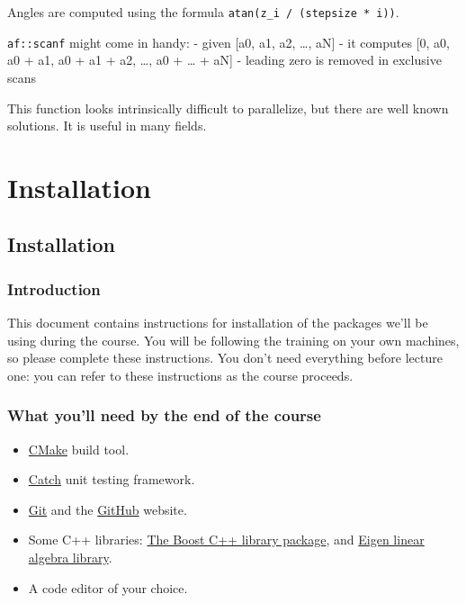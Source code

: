 Angles are computed using the formula
\texttt{atan(z\_i / (stepsize * i))}.

\texttt{af::scanf} might come in handy: - given {[}a0, a1, a2, \ldots{},
aN{]} - it computes {[}0, a0, a0 + a1, a0 + a1 + a2, \ldots{}, a0 +
\ldots{} + aN{]} - leading zero is removed in exclusive scans

This function looks intrinsically difficult to parallelize, but there
are well known solutions. It is useful in many fields.

\section{Installation}\label{installation}

\subsection{Installation}\label{installation-1}

\subsubsection{Introduction}\label{introduction-6}

This document contains instructions for installation of the packages
we'll be using during the course. You will be following the training on
your own machines, so please complete these instructions. You don't need
everything before lecture one: you can refer to these instructions as
the course proceeds.

\subsubsection{What you'll need by the end of the
course}\label{what-youll-need-by-the-end-of-the-course}

\begin{itemize}
\itemsep1pt\parskip0pt
\item
  \href{http://www.cmake.org}{CMake} build tool.
\item
  \href{https://github.com/philsquared/Catch}{Catch} unit testing
  framework.
\item
  \href{https://git-scm.com/}{Git} and the
  \href{https://github.com/}{GitHub} website.
\item
  Some C++ libraries: \href{http://www.boost.org/}{The Boost C++ library
  package}, and
  \href{http://eigen.tuxfamily.org/index.php?title=Main_Page}{Eigen
  linear algebra library}.
\item
  A code editor of your choice.
\end{itemize}


